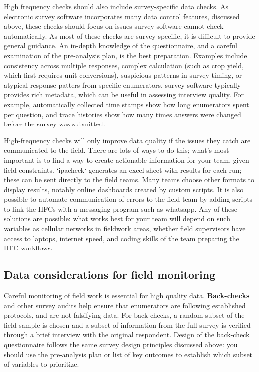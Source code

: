 High frequency checks should also include survey-specific data checks. As electronic survey 
software incorporates many data control features, discussed above, these checks 
should focus on issues survey software cannot check automatically. As most of 
these checks are survey specific, it is difficult to provide general guidance. 
An in-depth knowledge of the questionnaire, and a careful examination of the 
pre-analysis plan, is the best preparation. Examples include  consistency 
across multiple responses, complex calculation (such as crop yield, which first requires unit conversions), 
suspicious patterns in survey timing, or atypical response patters from specific enumerators. 
survey software typically provides rich metadata, which can be useful in 
assessing interview quality. For example, automatically collected time stamps 
show how long enumerators spent per question, and trace histories show how many 
times answers were changed before the survey was submitted.

High-frequency checks will only improve data quality if the issues they catch are communicated to the field.
There are lots of ways to do this; what's most important is to find a way to create actionable information for your team, given field constraints. 
`ipacheck` generates an excel sheet with results for each run; these can be sent directly to the field teams.
Many teams choose other formats to display results, notably online dashboards created by custom scripts.
It is also possible to automate communication of errors to the field team by adding scripts to link the HFCs with a messaging program such as whatsapp.
Any of these solutions are possible: what works best for your team will depend on such variables as cellular networks in fieldwork areas, whether field supervisors have access to laptops, internet speed, and coding skills of the team preparing the HFC workflows. 


\subsection{Data considerations for field monitoring}
Careful monitoring of field work is essential for high quality data.
\textbf{Back-checks} and 
other survey audits help ensure that enumerators are following established protocols, and are not falsifying data.
For back-checks, a random subset of the field sample is chosen and a subset of information from the full survey is 
verified through a brief interview with the original respondent.
Design of the back-check questionnaire follows the same survey design 
principles discussed above: you should use the pre-analysis plan 
or list of key outcomes to establish which subset of variables to prioritize.

